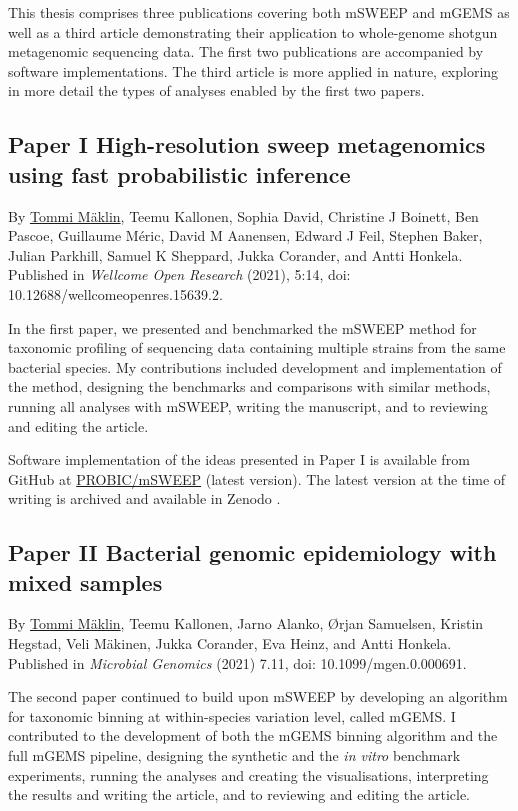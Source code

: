 \documentclass[officiallayout]{tktla}
\begin{document}
This thesis comprises three publications covering both mSWEEP and
mGEMS as well as a third article demonstrating their application to
whole-genome shotgun metagenomic sequencing data. The first two
publications are accompanied by software implementations. The third
article is more applied in nature, exploring in more detail the types
of analyses enabled by the first two papers.

\subsection*{Paper I \textemdash High-resolution sweep metagenomics using fast probabilistic inference}
By \underline{Tommi Mäklin}, Teemu Kallonen, Sophia David, Christine J
Boinett, Ben Pascoe, Guillaume Méric, David M Aanensen, Edward J Feil,
Stephen Baker, Julian Parkhill, Samuel K Sheppard, Jukka Corander, and
Antti Honkela. Published in \textit{Wellcome Open Research} (2021),
5:14, doi: 10.12688/wellcomeopenres.15639.2.

In the first paper, we presented and benchmarked the mSWEEP method for
taxonomic profiling of sequencing data containing multiple strains
from the same bacterial species. My contributions included development
and implementation of the method, designing the benchmarks and
comparisons with similar methods, running all analyses with mSWEEP,
writing the manuscript, and to reviewing and editing the article.

Software implementation of the ideas presented in Paper I is
available from GitHub at
\href{https://github.com/PROBIC/mSWEEP}{PROBIC/mSWEEP} (latest
version). The latest version at the time of writing is archived and
available in Zenodo \citep{maklin_mSWEEP}.

\subsection*{Paper II \textemdash Bacterial genomic epidemiology with mixed samples}
By \underline{Tommi Mäklin}, Teemu Kallonen, Jarno Alanko, Ørjan
Samuelsen, Kristin Hegstad, Veli Mäkinen, Jukka Corander, Eva Heinz,
and Antti Honkela. Published in \textit{Microbial Genomics} (2021)
7.11, doi: 10.1099/mgen.0.000691.

The second paper continued to build upon mSWEEP by developing an
algorithm for taxonomic binning at within-species variation level,
called mGEMS. I contributed to the development of both the mGEMS
binning algorithm and the full mGEMS pipeline, designing the synthetic
and the \textit{in vitro} benchmark experiments, running the analyses
and creating the visualisations, interpreting the results and writing
the article, and to reviewing and editing the article.
\end{document}
